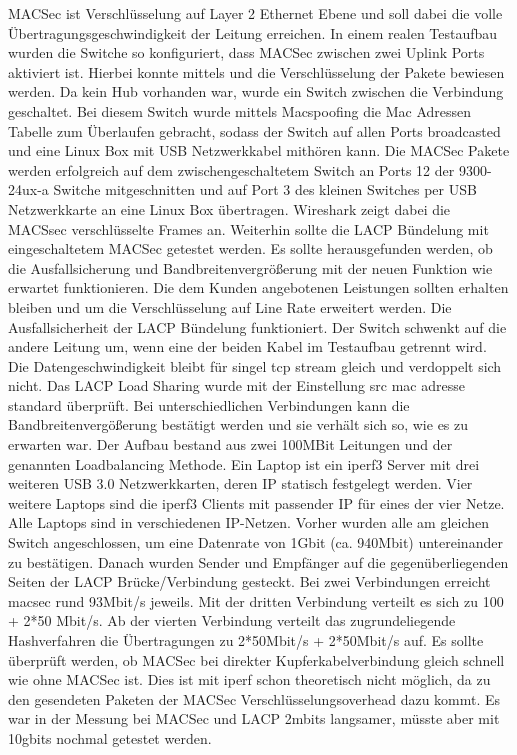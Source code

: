 \documentclass[english,runningheads,a4paper]{llncs}[2018/03/10]
\begin{document}
MACSec ist Verschlüsselung auf Layer 2 Ethernet Ebene und soll dabei die volle Übertragungsgeschwindigkeit der Leitung erreichen. In einem realen Testaufbau wurden die Switche so konfiguriert, dass MACSec zwischen zwei Uplink Ports aktiviert ist. Hierbei konnte mittels  und  die Verschlüsselung der Pakete bewiesen werden. Da kein Hub vorhanden war, wurde ein Switch zwischen die Verbindung geschaltet. Bei diesem Switch wurde mittels Macspoofing die Mac Adressen Tabelle zum Überlaufen gebracht, sodass der Switch auf allen Ports broadcasted und eine Linux Box mit USB Netzwerkkabel mithören kann. Die MACSec Pakete werden erfolgreich auf dem zwischengeschaltetem Switch an Ports 12 der 9300-24ux-a Switche mitgeschnitten und auf Port 3 des kleinen Switches per USB Netzwerkkarte an eine Linux Box übertragen. Wireshark zeigt dabei die MACSsec verschlüsselte Frames an.
Weiterhin sollte die LACP Bündelung mit eingeschaltetem MACSec getestet werden. Es sollte herausgefunden werden, ob die Ausfallsicherung und Bandbreitenvergrößerung mit der neuen Funktion wie erwartet funktionieren. Die dem Kunden angebotenen Leistungen sollten erhalten bleiben und um die Verschlüsselung auf Line Rate erweitert werden. Die Ausfallsicherheit der LACP Bündelung funktioniert. Der Switch schwenkt auf die andere Leitung um, wenn eine der beiden Kabel im Testaufbau getrennt wird. Die Datengeschwindigkeit bleibt für singel tcp stream gleich und verdoppelt sich nicht. Das LACP Load Sharing wurde mit der Einstellung src mac adresse standard überprüft. Bei unterschiedlichen Verbindungen kann die Bandbreitenvergößerung bestätigt werden und sie verhält sich so, wie es zu erwarten war. Der Aufbau bestand aus zwei 100MBit Leitungen und der genannten Loadbalancing Methode. Ein Laptop ist ein iperf3 Server mit drei weiteren USB 3.0 Netzwerkkarten, deren IP statisch festgelegt werden. Vier weitere Laptops sind die iperf3 Clients mit passender IP für eines der vier Netze. Alle  Laptops sind in verschiedenen IP-Netzen. Vorher wurden  alle am gleichen Switch angeschlossen, um eine Datenrate von 1Gbit (ca. 940Mbit) untereinander zu bestätigen. Danach wurden Sender und Empfänger auf die gegenüberliegenden Seiten der LACP Brücke/Verbindung gesteckt. Bei zwei Verbindungen erreicht macsec rund 93Mbit/s jeweils. Mit der dritten Verbindung verteilt es sich zu 100 + 2*50 Mbit/s. Ab der vierten Verbindung verteilt das zugrundeliegende Hashverfahren die Übertragungen zu 2*50Mbit/s + 2*50Mbit/s auf.
Es sollte überprüft werden, ob MACSec bei direkter Kupferkabelverbindung gleich schnell wie ohne MACSec ist. Dies ist mit iperf schon theoretisch nicht möglich, da zu den gesendeten Paketen der MACSec Verschlüsselungsoverhead dazu kommt. Es war in der Messung bei MACSec und LACP 2mbits langsamer, müsste aber mit 10gbits nochmal getestet werden. 
\end{document}
